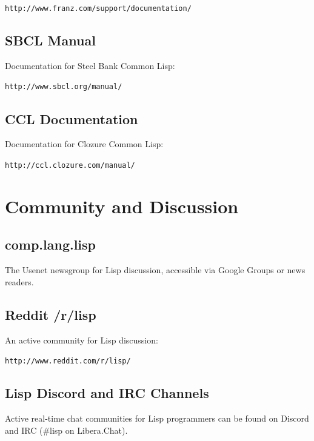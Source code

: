 \begin{center}
\texttt{http://www.franz.com/support/documentation/}
\end{center}

\subsection{SBCL Manual}

Documentation for Steel Bank Common Lisp:

\begin{center}
\texttt{http://www.sbcl.org/manual/}
\end{center}

\subsection{CCL Documentation}

Documentation for Clozure Common Lisp:

\begin{center}
\texttt{http://ccl.clozure.com/manual/}
\end{center}

\section{Community and Discussion}

\subsection{comp.lang.lisp}

The Usenet newsgroup for Lisp discussion, accessible via Google Groups or news readers.

\subsection{Reddit /r/lisp}

An active community for Lisp discussion:

\begin{center}
\texttt{http://www.reddit.com/r/lisp/}
\end{center}

\subsection{Lisp Discord and IRC Channels}

Active real-time chat communities for Lisp programmers can be found on Discord and
IRC (\#lisp on Libera.Chat).
